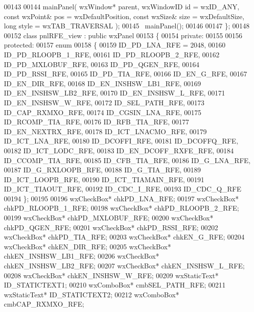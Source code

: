 \begin{DoxyCode}
00143         
00144         mainPanel( wxWindow* parent, wxWindowID \textcolor{keywordtype}{id} = wxID\_ANY, \textcolor{keyword}{const} wxPoint& pos = wxDefaultPosition, \textcolor{keyword}{
      const} wxSize& size = wxDefaultSize, \textcolor{keywordtype}{long} style = wxTAB\_TRAVERSAL ); 
00145         ~mainPanel();
00146     
00147 \};
00148 
00152 \textcolor{keyword}{class }pnlRFE_view : \textcolor{keyword}{public} wxPanel 
00153 \{
00154     \textcolor{keyword}{private}:
00155     
00156     \textcolor{keyword}{protected}:
00157         \textcolor{keyword}{enum}
00158         \{
00159             ID\_PD\_LNA\_RFE = 2048,
00160             ID_PD_RLOOPB_1_RFE,
00161             ID_PD_RLOOPB_2_RFE,
00162             ID_PD_MXLOBUF_RFE,
00163             ID_PD_QGEN_RFE,
00164             ID_PD_RSSI_RFE,
00165             ID_PD_TIA_RFE,
00166             ID_EN_G_RFE,
00167             ID_EN_DIR_RFE,
00168             ID_EN_INSHSW_LB1_RFE,
00169             ID_EN_INSHSW_LB2_RFE,
00170             ID_EN_INSHSW_L_RFE,
00171             ID_EN_INSHSW_W_RFE,
00172             ID_SEL_PATH_RFE,
00173             ID_CAP_RXMXO_RFE,
00174             ID_CGSIN_LNA_RFE,
00175             ID_RCOMP_TIA_RFE,
00176             ID_RFB_TIA_RFE,
00177             ID_EN_NEXTRX_RFE,
00178             ID_ICT_LNACMO_RFE,
00179             ID_ICT_LNA_RFE,
00180             ID_DCOFFI_RFE,
00181             ID_DCOFFQ_RFE,
00182             ID_ICT_LODC_RFE,
00183             ID_EN_DCOFF_RXFE_RFE,
00184             ID_CCOMP_TIA_RFE,
00185             ID_CFB_TIA_RFE,
00186             ID_G_LNA_RFE,
00187             ID_G_RXLOOPB_RFE,
00188             ID_G_TIA_RFE,
00189             ID_ICT_LOOPB_RFE,
00190             ID_ICT_TIAMAIN_RFE,
00191             ID_ICT_TIAOUT_RFE,
00192             ID_CDC_I_RFE,
00193             ID\_CDC\_Q\_RFE
00194         \};
00195         
00196         wxCheckBox* chkPD_LNA_RFE;
00197         wxCheckBox* chkPD_RLOOPB_1_RFE;
00198         wxCheckBox* chkPD_RLOOPB_2_RFE;
00199         wxCheckBox* chkPD_MXLOBUF_RFE;
00200         wxCheckBox* chkPD_QGEN_RFE;
00201         wxCheckBox* chkPD_RSSI_RFE;
00202         wxCheckBox* chkPD_TIA_RFE;
00203         wxCheckBox* chkEN_G_RFE;
00204         wxCheckBox* chkEN_DIR_RFE;
00205         wxCheckBox* chkEN_INSHSW_LB1_RFE;
00206         wxCheckBox* chkEN_INSHSW_LB2_RFE;
00207         wxCheckBox* chkEN_INSHSW_L_RFE;
00208         wxCheckBox* chkEN_INSHSW_W_RFE;
00209         wxStaticText* ID_STATICTEXT1;
00210         wxComboBox* cmbSEL_PATH_RFE;
00211         wxStaticText* ID_STATICTEXT2;
00212         wxComboBox* cmbCAP_RXMXO_RFE;

\end{DoxyCode}
